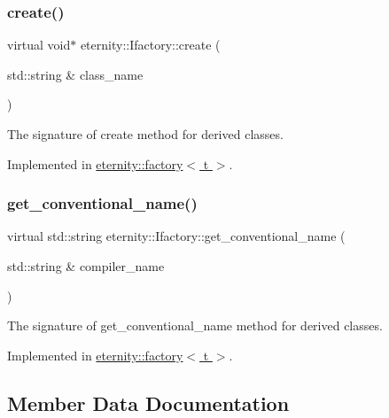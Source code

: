 \subsubsection{\texorpdfstring{create()}{create()}}
{\footnotesize\ttfamily virtual void$\ast$ eternity\+::\+Ifactory\+::create (\begin{DoxyParamCaption}\item[{std\+::string \&}]{class\+\_\+name }\end{DoxyParamCaption})\hspace{0.3cm}{\ttfamily [pure virtual]}}

The signature of create method for derived classes. 

Implemented in \hyperlink{classeternity_1_1factory_a08c1c494bc749955f9b0767d31933c2b}{eternity\+::factory$<$ t $>$}.

\mbox{\label{classeternity_1_1_ifactory_a6c2afa73d61aaa81233ab1216c508252}} 
\subsubsection{\texorpdfstring{get\+\_\+conventional\+\_\+name()}{get\_conventional\_name()}}
{\footnotesize\ttfamily virtual std\+::string eternity\+::\+Ifactory\+::get\+\_\+conventional\+\_\+name (\begin{DoxyParamCaption}\item[{std\+::string \&}]{compiler\+\_\+name }\end{DoxyParamCaption})\hspace{0.3cm}{\ttfamily [pure virtual]}}

The signature of get\+\_\+conventional\+\_\+name method for derived classes. 

Implemented in \hyperlink{classeternity_1_1factory_a0b7c7bc194b178379eb1b880f87d3b48}{eternity\+::factory$<$ t $>$}.



\subsection{Member Data Documentation}
\mbox{\label{classeternity_1_1_ifactory_a106788b385d5f378cb75bfb8f0296525}} 
